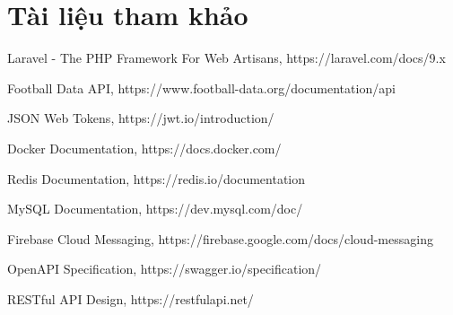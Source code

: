 \documentclass[a4paper,12pt]{report}
\begin{document}
\section{Tài liệu tham khảo}

\begin{thebibliography}{9}
    Laravel - The PHP Framework For Web Artisans, https://laravel.com/docs/9.x

    Football Data API, https://www.football-data.org/documentation/api

    JSON Web Tokens, https://jwt.io/introduction/

    Docker Documentation, https://docs.docker.com/

    Redis Documentation, https://redis.io/documentation

    MySQL Documentation, https://dev.mysql.com/doc/

    Firebase Cloud Messaging, https://firebase.google.com/docs/cloud-messaging

    OpenAPI Specification, https://swagger.io/specification/

    RESTful API Design, https://restfulapi.net/
\end{thebibliography}
\end{document}
